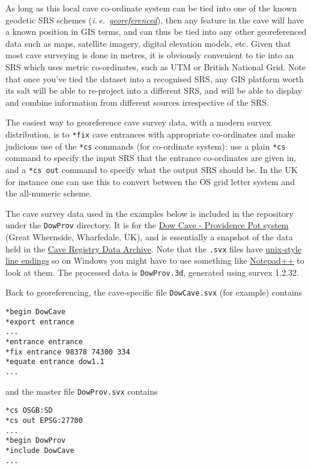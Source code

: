 \documentclass[]{article}
\newcommand{\latin}[1]{\emph{#1}}
\newcommand{\ie}{\latin{i.\,e.}}
\begin{document}
As long as this local cave co-ordinate system can be tied into one of
the known geodetic SRS schemes (\ie\
\href{https://en.wikipedia.org/wiki/Georeferencing}{\emph{georeferenced}}),
then any feature in the cave will have a known position in GIS terms,
and can thus be tied into any other georeferenced data such as maps,
satellite imagery, digital elevation models, etc. Given that most cave
surveying is done in metres, it is obviously convenient to tie into an
SRS which uses metric co-ordinates, such as UTM or British National
Grid. Note that once you've tied the dataset into a recognised SRS, any
GIS platform worth its salt will be able to re-project into a different
SRS, and will be able to display and combine information from different
sources irrespective of the SRS.

The easiest way to georeference cave survey data, with a modern survex
distribution, is to \verb}*fix} cave entrances with appropriate
co-ordinates and make judicious use of the \verb}*cs} commands (for
co-ordinate system): use a plain \verb}*cs} command to specify the
input SRS that the entrance co-ordinates are given in, and a
\verb}*cs out} command to specify what the output SRS should be. In
the UK for instance one can use this to convert between the OS grid
letter system and the all-numeric scheme.

The cave survey data used in the examples below is included in the
repository under the \verb}DowProv} directory. It is for the
\href{http://www.mudinmyhair.co.uk/}{Dow Cave - Providence Pot system}
(Great Whernside, Wharfedale, UK), and is essentially a snapshot of the
data held in the \href{http://cave-registry.org.uk/}{Cave Registry Data
Archive}. Note that the \verb}.svx} files have
\href{https://en.wikipedia.org/wiki/Newline}{unix-style line endings} so
on Windows you might have to use something like
\href{https://notepad-plus-plus.org/}{Notepad{\small++}} to look at them. The
processed data is \verb}DowProv.3d}, generated using survex 1.2.32.

Back to georeferencing, the cave-specific file \verb}DowCave.svx} (for
example) contains

\begin{verbatim}
*begin DowCave
*export entrance
...
*entrance entrance
*fix entrance 98378 74300 334
*equate entrance dow1.1
...
\end{verbatim}

and the master file \verb}DowProv.svx} contains

\begin{verbatim}
*cs OSGB:SD
*cs out EPSG:27700
...
*begin DowProv
*include DowCave
...
\end{verbatim}
\end{document}
